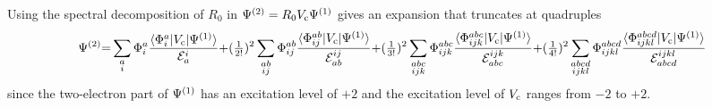 \documentclass[11pt]{article}
\numberwithin{equation}{section}
\begin{document}
\begin{ex}
\label{ex:second-order-wavefunction-expansion-unsimplified}
Using the spectral decomposition of $R_0$ in $\Psi ^{(2)}=R_0V_{\mathrm{c}}\Psi ^{(1)}$ gives an expansion that truncates at quadruples
\begin{align*}
  \Psi ^{(2)}
{=}
  \sum_{\substack{a\\i}}
  \Phi _i^a
  \frac {\langle\Phi _i^a|V_{\mathrm{c}}|\Psi ^{(1)}\rangle}{\mathcal{E}_a^i}
{+}
  (\tfrac{1}{2!})^2
  \sum_{\substack{ab\\ij}}
  \Phi _{ij}^{ab}
  \frac {\langle\Phi _{ij}^{ab}|V_{\mathrm{c}}|\Psi ^{(1)}\rangle}{\mathcal{E}_{ab}^{ij}}
{+}
  (\tfrac{1}{3!})^2
  \sum_{\substack{abc\\ijk}}
  \Phi _{ijk}^{abc}
  \frac {\langle\Phi _{ijk}^{abc}|V_{\mathrm{c}}|\Psi ^{(1)}\rangle}{\mathcal{E}_{abc}^{ijk}}
{+}
  (\tfrac{1}{4!})^2
  \sum_{\substack{abcd\\ijkl}}
  \Phi _{ijkl}^{abcd}
  \frac {\langle\Phi _{ijkl}^{abcd}|V_{\mathrm{c}}|\Psi ^{(1)}\rangle}{\mathcal{E}_{abcd}^{ijkl}}
\end{align*}
since the two-electron part of $\Psi ^{(1)}$ has an excitation level of $+2$ and the excitation level of $V_{\mathrm{c}}$ ranges from $-2$ to $+2$.
\end{ex}
\end{document}
